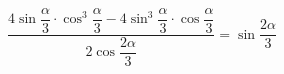 \begin{ex}[type=prove_identity]
	\begin{condition}
		\(\dfrac{4\sin\dfrac{\alpha}{3}\cdot\cos^3\dfrac{\alpha}{3}-4\sin^3\dfrac{\alpha}{3}\cdot\cos\dfrac{\alpha}{3}}{2\cos\dfrac{2\alpha}{3}}=\sin\dfrac{2\alpha}{3} \)
	\end{condition}
\end{ex}